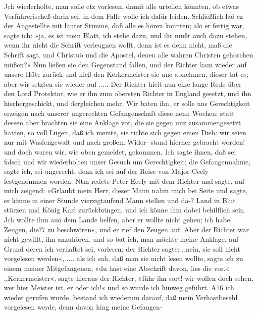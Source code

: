 Jch wiederholte, man solle etz vorlesen, damit alle urteilen könnten,
ob etwas Verführerischeß darin sei, in dem Falle wolle ich dafür
leiden. Schließlich laö ez der Angestellte mit lauter Stimme, daß
alle es hören konnten; alö er fertig war, sagte ich: »ja, es ist
mein Blatt, ich stehe dazu, und ihr müßt auch dazu stehen, wenn
ihr nicht die Schrift verleugnen wollt, denn ist es denn nicht, maß
die Schrift sagt, und Christuö und die Apostel, denen alle wahren
Christen gehorchen müßen?« Nun ließen sie den Gegenstand
fallen, und der Richter kam wieder auf unsere Hüte zurück und
hieß den Kerkermeister sie une abnehmen, dieser tat es; aber wir
setzten sie wieder auf ..... Der Richter hielt nun eine lange
Rede über den Lord Protektor, wie er ihn zum obersten Richter
in England gesetzt, und ihn hierhergeschickt, und dergleichen mehr.
Wir baten ihn, er solle uns Gerechtigkeit erzeigen nach unserer
ungerechten Gefangenschaft diese nenn Wochen; statt dessen aber
brachten sie eine Anklage vor, die sie gegen unz zusammengesetzt
hatten, so voll Lügen, daß ich meinte, sie richte sich gegen einen
Dieb: wir seien nur mit Wasfengewalt und nach großem Wider-
stand hierher gebracht worden! und doch waren wir, wie oben
gemeldet, gekommen. Ich sagte ihnen, daß sei falsch und wir
wiederholten unser Gesuch um Gerechtigkeit; die Gefangennahme,
sagte ich, sei ungerecht, denn ich sei auf der Reise von Major
Ceely festgenommen worden. Ntm redete Peter Eeely mit dem
Richter und sagte, auf mich zeigend: »Grlaubt mein Herr, dieser
Mann nahm mich bei Seite und sagte, er könne in einer Stunde
vierzigtaufend Mann stellen und da-? Land in Blut stürzen und
König Karl zurückbringen, und ich könne ihm dabei behilflich sein.
Jch wollte ihm auö dem Lande helfen, aber er wollte nicht
gehen; ich habe Zeugen, die?7 zu beschwören«, und er rief den
Zeugen auf. Aber der Richter war nicht gewillt, ihn anzuhören,
und so bat ich, man möchte meine Anklage, auf Grund deren
ich verhaftet sei, vorlesen; der Richter sagte: ,,nein, sie soll nicht
vorgelesen werden«, .... als ich sah, daß man sie nicht lesen
wollte, sagte ich zu einem meiner Mitgefangenen, »du hast eine
Abschrift davon, lies die vor.« ,,Kerkermeister«, sagte hieraus der
Richter, »führ ihn sort! wir wollen doch sehen, wer hier Meister
ist, er oder ich!« und so wurde ich hinweg geführt. A16 ich
wieder gerufen wurde, bestand ich wiederum darauf, daß mein
Verhastbesehl vorgelesen werde, denn davon hing meine Gefangen-


